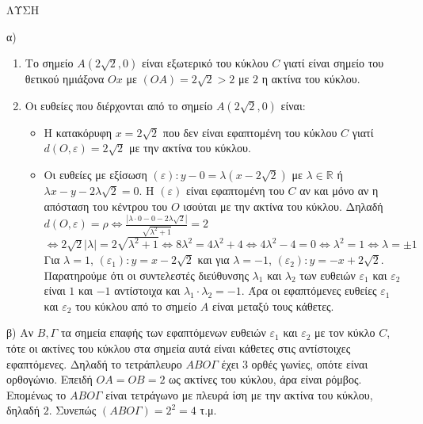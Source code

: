 ΛΥΣΗ

\noindent α)
\begin{enumerate}
\item[i.] Το σημείο $A(2\sqrt{2},0)$ είναι εξωτερικό του κύκλου $C$ γιατί είναι σημείο του θετικού ημιάξονα $Ox$ με $(OA) = 2\sqrt{2} > 2$ με $2$ η ακτίνα του κύκλου.
\item[ii.] Οι ευθείες που διέρχονται από το σημείο $A(2\sqrt{2},0)$ είναι:
\begin{itemize}
\item Η κατακόρυφη $x = 2\sqrt{2}$ που δεν είναι εφαπτομένη του κύκλου $C$ γιατί $d(O, \varepsilon) = 2\sqrt{2}$ με την ακτίνα του κύκλου.
\item Οι ευθείες με εξίσωση $(\varepsilon): y-0=\lambda(x-2\sqrt{2})$ με $\lambda \in \mathbb{R}$ ή $\lambda x - y - 2\lambda\sqrt{2}=0$.
Η $(\varepsilon)$ είναι εφαπτομένη του $C$ αν και μόνο αν η απόσταση του κέντρου του $O$ ισούται με την ακτίνα του κύκλου. Δηλαδή $d(O,\varepsilon) = \rho \iff \frac{|\lambda \cdot 0 - 0 - 2\lambda\sqrt{2}|}{\sqrt{\lambda^2+1}} = 2$
$\iff 2\sqrt{2}|\lambda| = 2\sqrt{\lambda^2+1} \iff 8\lambda^2 = 4\lambda^2+4 \iff 4\lambda^2-4=0 \iff \lambda^2=1 \iff \lambda = \pm 1$
Για $\lambda=1$, $(\varepsilon_1): y = x-2\sqrt{2}$ και για $\lambda=-1$, $(\varepsilon_2): y = -x+2\sqrt{2}$.
Παρατηρούμε ότι οι συντελεστές διεύθυνσης $\lambda_1$ και $\lambda_2$ των ευθειών $\varepsilon_1$ και $\varepsilon_2$ είναι $1$ και $-1$ αντίστοιχα και $\lambda_1 \cdot \lambda_2 = -1$. Άρα οι εφαπτόμενες ευθείες $\varepsilon_1$ και $\varepsilon_2$ του κύκλου από το σημείο $A$ είναι μεταξύ τους κάθετες.
\end{itemize}
\end{enumerate}

\noindent β) Αν $B, \Gamma$ τα σημεία επαφής των εφαπτόμενων ευθειών $\varepsilon_1$ και $\varepsilon_2$ με τον κύκλο $C$, τότε οι ακτίνες του κύκλου στα σημεία αυτά είναι κάθετες στις αντίστοιχες εφαπτόμενες. Δηλαδή το τετράπλευρο $ABO\Gamma$ έχει $3$ ορθές γωνίες, οπότε είναι ορθογώνιο. Επειδή $OA = OB = 2$ ως ακτίνες του κύκλου, άρα είναι ρόμβος. Επομένως το $ABO\Gamma$ είναι τετράγωνο με πλευρά ίση με την ακτίνα του κύκλου, δηλαδή $2$. Συνεπώς $(ABO\Gamma) = 2^2 = 4$ τ.μ.